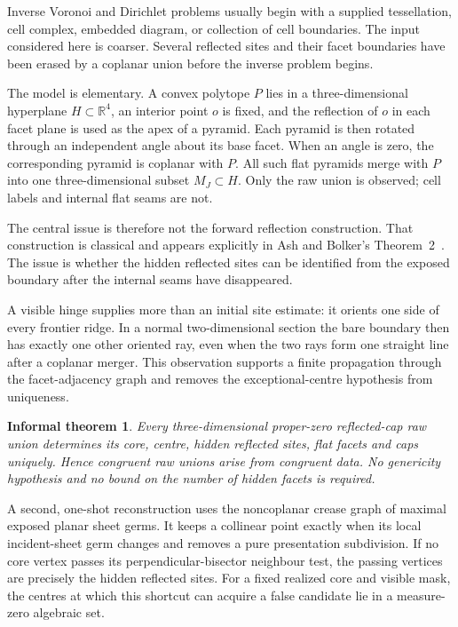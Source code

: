\documentclass[11pt]{amsart}
\newtheorem*{informaltheorem}{Informal theorem}
\theoremstyle{definition}
\newcommand{\R}{\mathbb{R}}
\begin{document}
Inverse Voronoi and Dirichlet problems usually begin with a supplied
tessellation, cell complex, embedded diagram, or collection of cell
boundaries.  The input considered here is coarser.  Several reflected sites
and their facet boundaries have been erased by a coplanar union before the
inverse problem begins.

The model is elementary.  A convex polytope $P$ lies in a three-dimensional
hyperplane $H\subset\R^4$, an interior point $o$ is fixed, and the reflection
of $o$ in each facet plane is used as the apex of a pyramid.  Each pyramid is
then rotated through an independent angle about its base facet.  When an angle
is zero, the corresponding pyramid is coplanar with $P$.  All such flat
pyramids merge with $P$ into one three-dimensional subset $M_J\subset H$.
Only the raw union is observed; cell labels and internal flat seams are not.

The central issue is therefore not the forward reflection construction.  That
construction is classical and appears explicitly in Ash and Bolker's
Theorem~2~\cite{AshBolker1985}.  The issue is whether the hidden reflected
sites can be identified from the exposed boundary after the internal seams
have disappeared.

A visible hinge supplies more than an initial site estimate: it orients one
side of every frontier ridge.  In a normal two-dimensional section the bare
boundary then has exactly one other oriented ray, even when the two rays form
one straight line after a coplanar merger.  This observation supports a finite
propagation through the facet-adjacency graph and removes the
exceptional-centre hypothesis from uniqueness.

\begin{informaltheorem}
Every three-dimensional proper-zero reflected-cap raw union determines its
core, centre, hidden reflected sites, flat facets and caps uniquely.  Hence
congruent raw unions arise from congruent data.  No genericity hypothesis and
no bound on the number of hidden facets is required.
\end{informaltheorem}

A second, one-shot reconstruction uses the noncoplanar crease graph of maximal
exposed planar sheet germs.  It keeps a collinear point exactly when its local
incident-sheet germ changes and removes a pure presentation subdivision.  If
no core vertex passes its perpendicular-bisector neighbour test, the passing
vertices are precisely the hidden reflected sites.  For a fixed realized core
and visible mask, the centres at which this shortcut can acquire a false
candidate lie in a measure-zero algebraic set.
\end{document}

